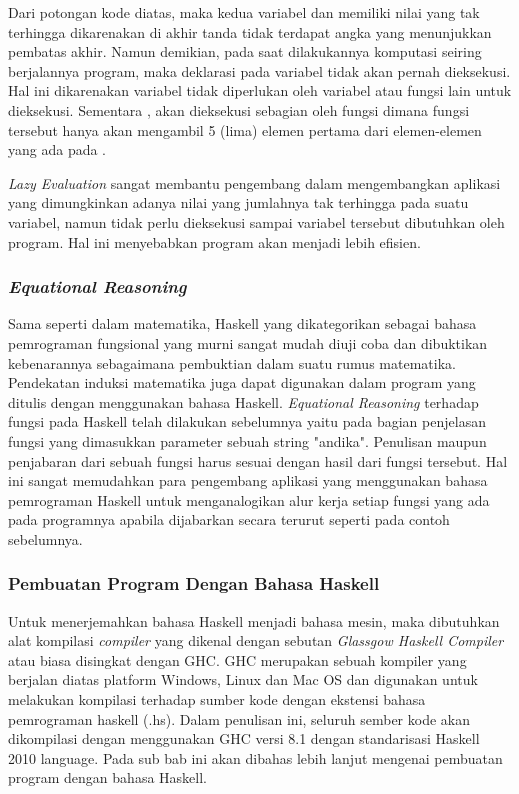 \documentclass[pi.tex]{subfile}
\begin{document}
 \hspace{8pt}Dari potongan kode diatas, maka kedua variabel  dan  memiliki nilai yang tak terhingga dikarenakan di akhir tanda  tidak terdapat angka yang menunjukkan pembatas akhir. Namun demikian, pada saat dilakukannya komputasi seiring berjalannya program, maka deklarasi pada variabel  tidak akan pernah dieksekusi. Hal ini dikarenakan variabel  tidak diperlukan oleh variabel atau fungsi lain untuk dieksekusi. Sementara , akan dieksekusi sebagian oleh fungsi  dimana fungsi tersebut hanya akan mengambil 5 (lima) elemen pertama dari elemen-elemen yang ada pada .

 \hspace{8pt}\emph{Lazy Evaluation} sangat membantu pengembang dalam mengembangkan aplikasi yang dimungkinkan adanya nilai yang jumlahnya tak terhingga pada suatu variabel, namun tidak perlu dieksekusi sampai variabel tersebut dibutuhkan oleh program. Hal ini menyebabkan program akan menjadi lebih efisien.

\subsubsection{\emph{Equational Reasoning}}\hspace{8pt}
  Sama seperti dalam matematika, Haskell yang dikategorikan sebagai bahasa pemrograman fungsional yang murni sangat mudah diuji coba dan dibuktikan kebenarannya sebagaimana pembuktian dalam suatu rumus matematika. Pendekatan induksi matematika juga dapat digunakan dalam program yang ditulis dengan menggunakan bahasa Haskell. \emph{Equational Reasoning} terhadap fungsi pada Haskell telah dilakukan sebelumnya yaitu pada bagian penjelasan fungsi  yang dimasukkan parameter sebuah string "andika". Penulisan maupun penjabaran dari sebuah fungsi harus sesuai dengan hasil dari fungsi tersebut. Hal ini sangat memudahkan para pengembang aplikasi yang menggunakan bahasa pemrograman Haskell untuk menganalogikan alur kerja setiap fungsi yang ada pada programnya apabila dijabarkan secara terurut seperti pada contoh sebelumnya.

\subsubsection{Pembuatan Program Dengan Bahasa Haskell}\hspace{11pt}
Untuk menerjemahkan bahasa Haskell menjadi bahasa mesin, maka dibutuhkan alat kompilasi \emph{compiler} yang dikenal dengan sebutan \emph{Glassgow Haskell Compiler} atau biasa disingkat dengan GHC. GHC merupakan sebuah kompiler yang berjalan diatas platform Windows, Linux dan Mac OS dan digunakan untuk melakukan kompilasi terhadap sumber kode dengan ekstensi bahasa pemrograman haskell (.hs). Dalam penulisan ini, seluruh sember kode akan dikompilasi dengan menggunakan GHC versi 8.1 dengan standarisasi Haskell 2010 language. Pada sub bab ini akan dibahas lebih lanjut mengenai pembuatan program dengan bahasa Haskell.
\end{document}
